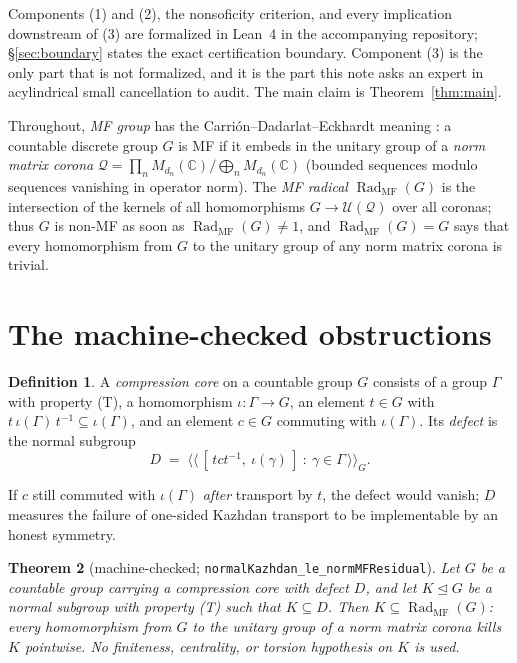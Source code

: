 \documentclass[11pt]{amsart}
\newtheorem{theorem}{Theorem}[section]
\theoremstyle{remark}
\theoremstyle{definition}
\newtheorem{definition}[theorem]{Definition}
\newcommand{\C}{\mathbb C}
\newcommand{\RadMF}{\operatorname{Rad}_{\mathrm{MF}}}
\newcommand{\ncl}[1]{\langle\!\langle #1\rangle\!\rangle}
\begin{document}
Components (1) and (2), the nonsoficity criterion, and every implication
downstream of (3) are formalized in Lean~4 in the accompanying repository;
\S\ref{sec:boundary} states the exact certification boundary.  Component (3)
is the only part that is not formalized, and it is the part this note asks an
expert in acylindrical small cancellation to audit.  The main claim is
Theorem~\ref{thm:main}.

Throughout, \emph{MF group} has the Carri\'on--Dadarlat--Eckhardt meaning
\cite{CDE}: a countable discrete group $G$ is MF if it embeds in the unitary
group of a \emph{norm matrix corona}
$\mathcal Q=\prod_n M_{d_n}(\C)/\bigoplus_n M_{d_n}(\C)$
(bounded sequences modulo sequences vanishing in operator norm).  The
\emph{MF radical} $\RadMF(G)$ is the intersection of the kernels of all
homomorphisms $G\to\mathcal U(\mathcal Q)$ over all coronas; thus $G$ is
non-MF as soon as $\RadMF(G)\neq1$, and $\RadMF(G)=G$ says that every
homomorphism from $G$ to the unitary group of any norm matrix corona is
trivial.

\section{The machine-checked obstructions}\label{sec:obstruction}

\begin{definition}\label{def:core}
A \emph{compression core} on a countable group $G$ consists of a group
$\Gamma$ with property \textup{(T)}, a homomorphism
$\iota\colon\Gamma\to G$, an element $t\in G$ with
$t\,\iota(\Gamma)\,t^{-1}\subseteq\iota(\Gamma)$, and an element $c\in G$
commuting with $\iota(\Gamma)$.  Its \emph{defect} is the normal subgroup
\[
D \;=\; \ncl{\,[\,t c t^{-1},\ \iota(\gamma)\,]\ :\ \gamma\in\Gamma\,}_G .
\]
\end{definition}

If $c$ still commuted with $\iota(\Gamma)$ \emph{after} transport by $t$,
the defect would vanish; $D$ measures the failure of one-sided Kazhdan
transport to be implementable by an honest symmetry.

\begin{theorem}[machine-checked; \texttt{normalKazhdan\_le\_normMFResidual}]
\label{thm:radical}
Let $G$ be a countable group carrying a compression core with defect $D$,
and let $K\trianglelefteq G$ be a normal subgroup with property \textup{(T)}
such that $K\subseteq D$.  Then $K\subseteq\RadMF(G)$: every homomorphism
from $G$ to the unitary group of a norm matrix corona kills $K$ pointwise.
No finiteness, centrality, or torsion hypothesis on $K$ is used.
\end{theorem}
\end{document}
